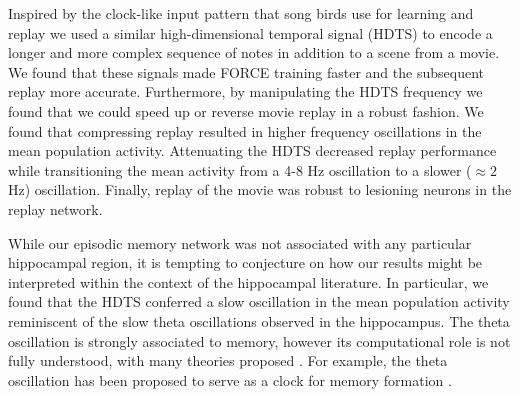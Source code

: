\documentclass[11pt]{article} %
\begin{document}



Inspired by the clock-like input pattern that song birds use for learning and replay \cite{Fee3,Hanloser} we used a similar high-dimensional temporal signal (HDTS) to encode a longer and more complex sequence of notes in addition to a scene from a movie.  We found that these signals made FORCE training faster and the subsequent replay more accurate.  Furthermore, by manipulating the HDTS frequency we found that we could speed up or reverse movie replay in a robust fashion. We found that compressing replay resulted in higher frequency oscillations in the mean population activity.  Attenuating the HDTS decreased replay performance while transitioning the mean activity from a 4-8 Hz oscillation to a slower ($\approx 2$ Hz) oscillation.  Finally, replay of the movie was robust to lesioning neurons in the replay network. 


While our episodic memory network was not associated with any particular hippocampal region, it is tempting to conjecture on how our results might be interpreted within the context of the hippocampal literature.  In particular, we found that the HDTS conferred a slow oscillation in the mean population activity reminiscent of the slow theta oscillations observed in the hippocampus.  The theta oscillation is strongly associated to memory, however its computational role is not fully understood, with many theories proposed \cite{thetareview1,thetareview2,thetareview3,thetareview4}.  For example, the theta oscillation has been proposed to serve as a clock for memory formation \cite{travellingwave,thetareview1}.    
\end{document}
